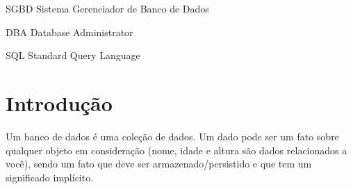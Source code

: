\documentclass[
	12pt,				%
	openright,			%
	oneside,			%
	a4paper,			%
	english,			%
	french,				%
	spanish,			%
	brazil,				%
	]{abntex2}
\begin{document}
\frenchspacing 


\imprimircapa

\listoffigures*
\cleardoublepage

\listoftables*
\cleardoublepage

\begin{siglas}
  \item[SGBD] Sistema Gerenciador de Banco de Dados
  \item[DBA] Database Administrator
  \item[SQL] Standard Query Language
\end{siglas}


\tableofcontents*
\cleardoublepage



\textual

\chapter*[Introdução]{Introdução}

Um banco de dados é uma coleção de dados. Um dado pode ser um fato sobre qualquer objeto em consideração (nome, idade e altura são dados relacionados a você), sendo um fato que deve ser armazenado/persistido e que tem um significado implícito.
\end{document}
